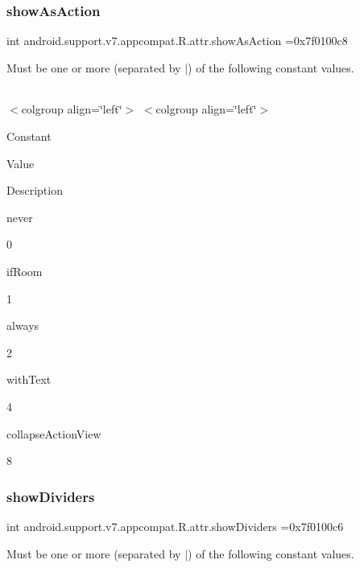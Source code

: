 \subsubsection{\texorpdfstring{show\+As\+Action}{showAsAction}}
{\footnotesize\ttfamily int android.\+support.\+v7.\+appcompat.\+R.\+attr.\+show\+As\+Action =0x7f0100c8\hspace{0.3cm}{\ttfamily [static]}}

Must be one or more (separated by \textquotesingle{}$\vert$\textquotesingle{}) of the following constant values.

\tabulinesep=1mm
\begin{longtabu} spread 0pt [c]{*{0}{|X[-1]}|}
\hline
\end{longtabu}
$<$colgroup align=\char`\"{}left\char`\"{}$>$ $<$colgroup align=\char`\"{}left\char`\"{}$>$ 

Constant

Value

Description 

{\ttfamily never}

0

{\ttfamily if\+Room}

1

{\ttfamily always}

2

{\ttfamily with\+Text}

4

{\ttfamily collapse\+Action\+View}

8\mbox{\label{classandroid_1_1support_1_1v7_1_1appcompat_1_1R_1_1attr_a7d2a1f3c253160c329280ef49c5a5eba}} 
\subsubsection{\texorpdfstring{show\+Dividers}{showDividers}}
{\footnotesize\ttfamily int android.\+support.\+v7.\+appcompat.\+R.\+attr.\+show\+Dividers =0x7f0100c6\hspace{0.3cm}{\ttfamily [static]}}

Must be one or more (separated by \textquotesingle{}$\vert$\textquotesingle{}) of the following constant values.

